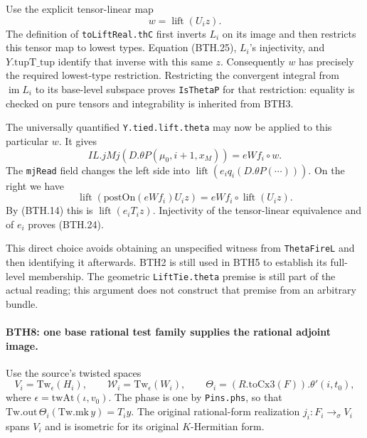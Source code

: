 Use the explicit tensor-linear map
\[
                  w=\operatorname{lift}(U_i z).                \tag{BTH.26}
\]
The definition of \texttt{to\allowbreak Lift\allowbreak Real.th\allowbreak C} first inverts
\(L_i\) on its image and then restricts this tensor map to
lowest types.  Equation (BTH.25), \(L_i\)'s injectivity,
and \(Y.\mathrm{tupT\_tup}\) identify that inverse with
this same \(z\).  Consequently \(w\) has precisely the
required lowest-type restriction.  Restricting the
convergent integral from \(\operatorname{im}L_i\) to its
base-level subspace proves \texttt{Is\allowbreak Theta\allowbreak P} for that
restriction: equality is checked on pure tensors and
integrability is inherited from BTH3.

The universally quantified \texttt{Y.tied.lift.theta}
may now be applied to this particular \(w\).  It gives
\[
      IL.jMj(D.\theta P(\mu_0,i+1,x_M))
             =eWf_i\circ w.                                    \tag{BTH.27}
\]
The \texttt{mj\allowbreak Read} field changes the left side into
\(\operatorname{lift}(e_i q_i(D.\theta P(\cdots)))\).
On the right we have
\[
 \operatorname{lift}(\mathrm{postOn}(eWf_i)U_i z)
     =eWf_i\circ\operatorname{lift}(U_i z).
\]
By (BTH.14) this is
\(\operatorname{lift}(e_i T_i z)\).
Injectivity of the tensor-linear equivalence and of \(e_i\)
proves (BTH.24).

This direct choice avoids obtaining an unspecified witness
from \texttt{Theta\allowbreak Fire\allowbreak L} and then identifying it afterwards.
BTH2 is still used in BTH5 to establish its full-level
membership.  The geometric \texttt{Lift\allowbreak Tie.theta} premise
is still part of the actual reading; this argument does
not construct that premise from an arbitrary bundle.

\paragraph{BTH8: one base rational test family supplies the rational adjoint image.}
\label{claim:BTH8}
Use the source's twisted spaces
\[
 V_i=\mathrm{Tw}_{\epsilon}(H_i),\qquad
 \mathcal W_i=\mathrm{Tw}_{\epsilon}(W_i),\qquad
 \Theta_i=(R.\mathrm{toCx3}(F)).\theta'(i,t_0),                  \tag{BTH.28}
\]
where \(\epsilon=\mathrm{twAt}(\iota,v_0)\).  The phase is
one by \texttt{Pins.phs}, so that
\(\mathrm{Tw.out}\,\Theta_i(\mathrm{Tw.mk}\,y)=T_i y\).
The original rational-form realization
\(j_i:F_i\to_\sigma V_i\) spans \(V_i\) and is isometric
for its original \(K\)-Hermitian form.

